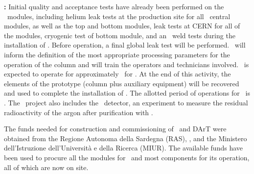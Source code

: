 \textbf{\Aria:} Initial quality and acceptance tests have already been performed on the \SeruciOne\ modules, including helium leak tests at the production site for all \AriaCentralModulesNumber\ central modules, as well as the top and bottom modules, leak tests at CERN for all of the  modules, cryogenic test of bottom module, and an \xr\ weld tests during the installation of \SeruciZero.  Before operation, a final global leak test will be performed.  \SeruciZero\ will inform the definition of the most appropriate processing parameters for the operation of the column and will train the operators and technicians involved. \SeruciZero\ is expected to operate for approximately \AriaSeruciZeroOperationPeriod\ for \SeruciZero.  At the end of this activity, the elements of the prototype (column plus auxiliary equipment) will be recovered and used to complete the installation of \SeruciOne.  The allotted period of operations for \SeruciOne\ is \AriaSeruciOneOperationPeriod.  The \Aria\ project also includes the \DArT\ detector, an experiment to measure the residual radioactivity of the argon after purification with \Aria. 

The funds needed for construction and commissioning of \SeruciOne\ and DArT were obtained from the Regione Autonoma della Sardegna (RAS), \INFN, and the Ministero dell'Istruzione dell'Universit\`{a} e della Ricerca (MIUR). The available funds have been used to procure all the modules for \SeruciOne\ and most components for its operation, all of which are now on site. 